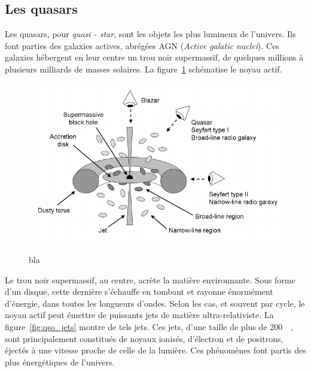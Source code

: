 \documentclass[11pt, twoside, a4paper, openright]{report}
\begin{document}
\subsection{Les quasars}
Les quasars, pour \emph{quasi - star}, sont les objets les plus lumineux de l'univers. Ils font parties des galaxies actives, abrégées AGN (\emph{Active galatic nuclei}). Ces galaxies hébergent en leur centre un trou noir supermassif, de quelques millions à plusieurs milliards de masses solaires. La figure~\ref{fig:schema_qso} schématise le noyau actif. 
\begin{figure}[h]
  \centering
  \includegraphics[scale=0.5]{schema_qso.png}
  \caption{bla}
  \label{fig:schema_qso}
\end{figure}
Le trou noir supermassif, au centre, acrète la matière environnante. Sous forme d'un disque, cette dernière s'échauffe en tombant et rayonne énormément d'énergie, dans toutes les longueurs d'ondes. Selon les cas, et souvent par cycle, le noyau actif peut émettre de puissants jets de matière ultra-relativiste. La figure~\ref{fig:qso_jets} montre de tels jets. Ces jets, d'une taille de plus de \SI{200}{\perh\kpc}, sont principalement constitués de noyaux ionisés, d'électron et de positrons, éjectés à une vitesse proche de celle de la lumière. Ces phénomènes font partis des plus énergétiques de l'univers.
\end{document}
